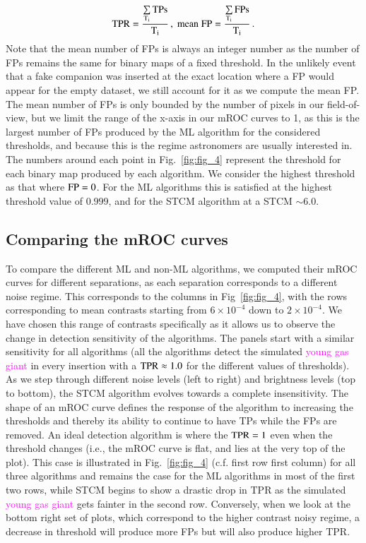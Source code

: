 \documentclass[referee]{aa} %
\newcommand{\newchange}[1]{\textcolor{magenta}{#1}}
\begin{document}
\begin{equation}
\rm{TPR} =\dfrac{\sum\limits_{T_i}\rm{TPs}}{T_i} \, , \; 
\rm{mean\; FP} = \dfrac{\sum\limits_{T_i}FPs}{T_i} \, .
\label{eq:TPR}
\end{equation}
Note that the mean number of FPs is always an integer number as the number of FPs remains the same for binary maps of a fixed threshold.
In the unlikely event that a fake companion was inserted at the exact location where a FP would appear for the empty dataset, we still account for it as we compute the mean FP. The mean number of FPs is only bounded by the number of pixels in our field-of-view, but we limit the range of the x-axis in our mROC curves to 1, as this is the largest number of FPs produced by the ML algorithm for the considered thresholds, and because this is the regime astronomers are usually interested in.
The numbers around each point in Fig.~\ref{fig:fig_4} represent the threshold for each binary map produced by each algorithm.
We consider the highest threshold as that where ${\rm FP} = 0$.
For the ML algorithms this is satisfied at the highest threshold value of $0.999$, and for the STCM algorithm at a STCM $\sim 6.0$. 

\subsection{Comparing the mROC curves}
\label{sec:roc}


To compare the different ML and non-ML algorithms, we computed their mROC curves for different separations, as each separation corresponds to a different noise regime.
This corresponds to the columns in Fig~\ref{fig:fig_4}, with the rows corresponding to mean contrasts starting from $6\times10^{-4}$ down to $2\times10^{-4}$.
We have chosen this range of contrasts specifically as it allows us to observe the change in detection sensitivity of the algorithms. The panels start with a similar sensitivity for all algorithms (all the algorithms detect the simulated \newchange{young gas giant} in every insertion with a ${\rm TPR}\approx 1.0$ for the different values of thresholds). 
As we step through different noise levels (left to right) and brightness levels (top to bottom), the STCM algorithm evolves towards a complete insensitivity.
The shape of an mROC curve defines the response of the algorithm to increasing the thresholds and thereby its ability to continue to have TPs while the FPs are removed.
An ideal detection algorithm is where the ${\rm TPR}=1$ even when the threshold changes (i.e., the mROC curve is flat, and lies at the very top of the plot).
This case is illustrated in Fig.~\ref{fig:fig_4}  (c.f. first row first column) for all three algorithms and remains the case for the ML algorithms in most of the first two rows, while STCM begins to show a drastic drop in TPR as the simulated \newchange{young gas giant} gets fainter in the second row.
Conversely, when we look at the bottom right set of plots, which correspond to the higher contrast noisy regime, a decrease in threshold will produce more FPs but will also produce higher TPR. 
\end{document}
